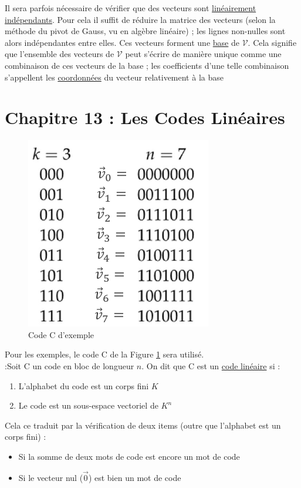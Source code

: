 \documentclass[11pt,a4paper]{article}
\renewcommand{\)}{\right)}
\renewcommand{\(}{\left(}
\newcommand{\m}[1]{\ensuremath{\mathcal{#1}}}
\begin{document}
Il sera parfois nécessaire de vérifier que des vecteurs sont \uline{linéairement indépendants}. Pour cela il suffit de réduire la matrice des vecteurs (selon la méthode du pivot de Gauss, vu en algèbre linéaire) ; les lignes non-nulles sont alors indépendantes entre elles. Ces vecteurs forment une \uline{base} de \m{V}. Cela signifie que l'ensemble des vecteurs de \m{V} peut s'écrire de manière unique comme une combinaison de ces vecteurs de la base ; les coefficients d'une telle combinaison s'appellent les \uline{coordonnées} du vecteur relativement à la base

\section[Codes linéaires]{Chapitre 13 : Les Codes Linéaires}
\begin{figure}	
	\includegraphics[scale=0.5]{images/code_C}
	\captionsetup{justification=centering}	
	\caption{Code C d'exemple}
	\label{code d'exemple}
\end{figure}
Pour les exemples, le code C de la Figure \ref{code d'exemple} sera utilisé.\\
 :Soit C un code en bloc de longueur $n$. On dit que C est un \uline{code linéaire} si :
\begin{enumerate}
	\item 	L'alphabet du code est un corps fini $K$
	\item 	Le code est un sous-espace vectoriel de $K^n$
\end{enumerate}
Cela ce traduit par la vérification de deux items (outre que l'alphabet est un corps fini) :
\begin{itemize}
	\item 	Si la somme de deux mots de code est encore un mot de code
	\item 	Si le vecteur nul ($\vec{0}$) est bien un mot de code
\end{itemize}
\end{document}
